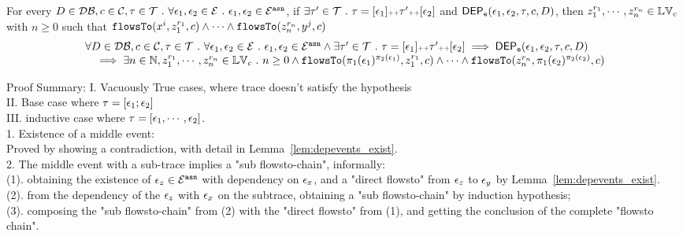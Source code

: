 %
\begin{thm}
\label{thm:flowsto_event_soundness}
For every $D \in \mathcal{DB} , c \in \mathcal{C}, \mathtt{\tau} \in \mathcal{T}  ~.~ \forall \mathtt{\epsilon}_1, \mathtt{\epsilon}_2 \in \mathcal{E}  ~.~
\mathtt{\epsilon}_1, \mathtt{\epsilon}_2 \in \mathcal{E}^{\mathtt{{asn}}}$, 
if $\exists \mathtt{\tau}' \in \mathcal{T}  ~.~ \mathtt{\tau} = [\mathtt{\epsilon}_1] {\scriptscriptstyle ++} \mathtt{\tau}' {\scriptscriptstyle ++} [\mathtt{\epsilon}_2]$ and 
$\mathsf{DEP_{\mathtt{e}}}(\mathtt{\epsilon}_1, \mathtt{\epsilon}_2, \mathtt{\tau}, c, D) $, then
 $z_1^{r_1}, \cdots, z_n^{r_n} \in \mathbb{LV}_{{c}}$ with $n \geq 0$ such that   
$\mathtt{flowsTo}(x^i,  z_1^{r_1}, c) 
\land \cdots \land \mathtt{flowsTo}(z_n^{r_n}, y^j, c)$
%
\[
  \begin{array}{l}
		\forall D \in \mathcal{DB} , c \in \mathcal{C}, \mathtt{\tau} \in \mathcal{T}  ~.~ \forall \mathtt{\epsilon}_1, \mathtt{\epsilon}_2 \in \mathcal{E}  ~.~
    \mathtt{\epsilon}_1, \mathtt{\epsilon}_2 \in \mathcal{E}^{\mathtt{{asn}}} \land 
		 \exists \mathtt{\tau}' \in \mathcal{T}  ~.~ \mathtt{\tau} = [\mathtt{\epsilon}_1] {\scriptscriptstyle ++} \mathtt{\tau}' {\scriptscriptstyle ++} [\mathtt{\epsilon}_2]
		\implies
		\mathsf{DEP_{\mathtt{e}}}(\mathtt{\epsilon}_1, \mathtt{\epsilon}_2, \mathtt{\tau}, c, D) 
		\\ \quad 
		\implies 
    \exists n \in \mathbb{N}, z_1^{r_1}, \cdots, z_n^{r_n} \in \mathbb{LV}_{{c}}  ~.~ n \geq 0 \land
		\mathtt{flowsTo}(\pi_1(\mathtt{\epsilon}_1)^{\pi_2(\mathtt{\epsilon}_1)},  z_1^{r_1}, c) 
    \land \cdots \land \mathtt{flowsTo}(z_n^{r_n}, \pi_1(\mathtt{\epsilon}_2)^{\pi_2(\mathtt{\epsilon}_2)}, c) 
	\end{array}
\]
\end{thm}
Proof Summary:
I. Vacuously True cases, where trace doesn't satisfy the hypothesis 
\\
II. Base case where $\mathtt{\tau} = [\mathtt{\epsilon}_1;\mathtt{\epsilon}_2]$
\\
III. inductive case where $\mathtt{\tau} = [\mathtt{\epsilon}_1, \cdots, \mathtt{\epsilon}_2]$.
\\
1. Existence of a middle event:
\\
Proved by showing a contradiction, with detail in Lemma~\ref{lem:depevents_exist}.
%
\\
2. The middle event with a sub-trace implies a "sub flowsto-chain", informally:
%
\\
(1). obtaining the existence of $\mathtt{\epsilon}_z \in \mathcal{E}^{\mathtt{{asn}}} $ with dependency on $\mathtt{\epsilon}_x$, and a "direct flowsto" from $\mathtt{\epsilon}_z$ to $\mathtt{\epsilon}_y$
by Lemma~\ref{lem:depevents_exist}.
 \\
(2). from the dependency of the $\mathtt{\epsilon}_z$ with $\mathtt{\epsilon}_x$ on the subtrace,
 obtaining a "sub flowsto-chain" by induction  hypothesis;
 \\
(3). composing the "sub flowsto-chain" from (2) with the  "direct flowsto" from (1), and getting the conclusion of
 the complete "flowsto chain".
